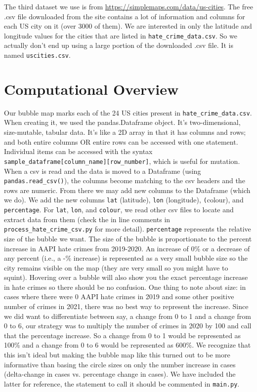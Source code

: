 \documentclass[fontsize=11pt]{article}
\begin{document}
    The third dataset we use is from
    \url{https://simplemaps.com/data/us-cities}. The free .csv file downloaded from the site contains a lot of information and columns for each US city on it (over 3000 of them). We are interested in only the latitude and longitude values for the cities that are listed in \texttt{hate\_crime\_data.csv}. So we actually don't end up using a large portion of the downloaded .csv file. It is named \texttt{uscities.csv}.

\section*{Computational Overview}

    \quad Our bubble map marks each of the 24 US cities present in \texttt{hate\_crime\_data.csv}. When creating it, we used the pandas.Dataframe object. It's two-dimensional, size-mutable, tabular data. It's like a 2D array in that it has columns and rows; and both entire columns OR entire rows can be accessed with one statement. Individual items can be accessed with the syntax \texttt{sample\_dataframe[column\_name][row\_number]}, which is useful for mutation. When a csv is read and the data is moved to a Dataframe (using \texttt{pandas.read\_csv()}), the columns become matching to the csv headers and the rows are numeric. From there we may add new columns to the Dataframe (which we do). We add the new columns \texttt{lat} (latitude), \texttt{lon} (longitude), \texttt(colour), and \texttt{percentage}. For \texttt{lat}, \texttt{lon}, and \texttt{colour}, we read other csv files to locate and extract data from them (check the in line comments in \texttt{process\_hate\_crime\_csv.py} for more detail). \texttt{percentage} represents the relative size of the bubble we want. The size of the bubble is proportionate to the percent increase in AAPI hate crimes from 2019-2020. An increase of 0\% or a decrease of any percent (i.e., a -\% increase) is represented as a very small bubble size so the city remains visible on the map (they are very small so you might have to squint). Hovering over a bubble will also show you the exact percentage increase in hate crimes so there should be no confusion. One thing to note about size: in cases where there were 0 AAPI hate crimes in 2019 and some other positive number of crimes in 2021, there was no best way to represent the increase. Since we did want to differentiate between say, a change from 0 to 1 and a change from 0 to 6, our strategy was to multiply the number of crimes in 2020 by 100 and call that the percentage increase. So a change from 0 to 1 would be represented as 100\% and a change from 0 to 6 would be represented as 600\%. We recognize that this isn't ideal but making the bubble map like this turned out to be more informative than basing the circle sizes on only the number increase in cases (delta-change in cases vs. percentage change in cases). We have included the latter for reference, the statement to call it should be commented in \texttt{main.py}.
\end{document}
